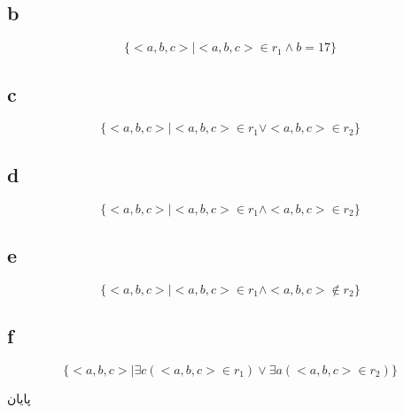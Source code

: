 \documentclass[a4paper]{article}
\newcommand{\goodby}{\begin{center}{\huge
پایان
}\end{center}}
\begin{document}
\subsection*{b}
\begin{displaymath}
  \{<a, b, c>|<a,b,c> \in r_1 \land b=17\}
\end{displaymath}

\subsection*{c}
\begin{displaymath}
  \{<a, b, c>|<a, b, c> \in r_1 \lor <a, b, c> \in r_2\}
\end{displaymath}

\subsection*{d}
\begin{displaymath}
  \{<a, b, c>|<a, b, c> \in r_1 \land <a, b, c> \in r_2\}
\end{displaymath}

\subsection*{e}
\begin{displaymath}
  \{<a, b, c>|<a, b, c> \in r_1 \land <a, b, c> \notin r_2\}
\end{displaymath}

\subsection*{f}
\begin{displaymath}
  \{<a, b, c>|\exists c (<a,b,c> \in r_1) \lor \exists a (<a,b,c> \in r_2)\}
\end{displaymath}

\newpage
\goodby
\end{document}
